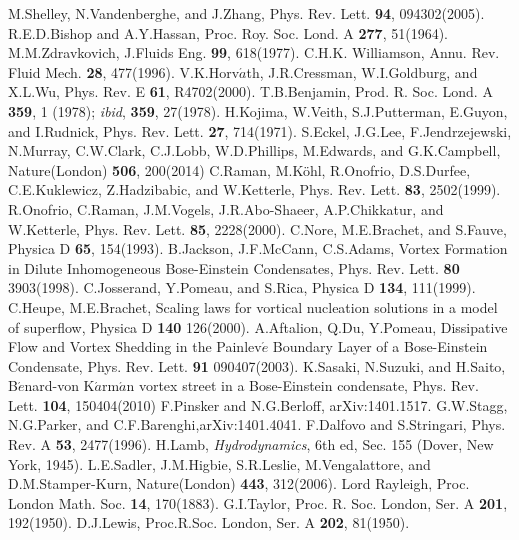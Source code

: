\documentclass[12pt,a4paper]{report}
\begin{document}
\begin{thebibliography}{81}
 M.Shelley, N.Vandenberghe, and J.Zhang, Phys. Rev. Lett. {\bf 94}, 094302(2005).
 R.E.D.Bishop and A.Y.Hassan, Proc. Roy. Soc. Lond. A {\bf 277}, 51(1964).
 M.M.Zdravkovich, J.Fluids Eng. {\bf 99}, 618(1977).
 C.H.K. Williamson, Annu. Rev. Fluid Mech. {\bf 28}, 477(1996).
 V.K.Horv$\acute{a}$th, J.R.Cressman, W.I.Goldburg, and X.L.Wu, Phys. Rev. E {\bf 61}, R4702(2000).
 T.B.Benjamin, Prod. R. Soc. Lond. A {\bf 359}, 1 (1978); {\it ibid}, {\bf 359}, 27(1978).
 H.Kojima, W.Veith, S.J.Putterman, E.Guyon, and I.Rudnick, Phys. Rev. Lett. {\bf 27}, 714(1971).
 S.Eckel, J.G.Lee, F.Jendrzejewski, N.Murray, C.W.Clark, C.J.Lobb, W.D.Phillips, M.Edwards, and G.K.Campbell, Nature(London) {\bf 506}, 200(2014)
 C.Raman, M.K\"{o}hl, R.Onofrio, D.S.Durfee, C.E.Kuklewicz, Z.Hadzibabic, and W.Ketterle, Phys. Rev. Lett. {\bf 83}, 2502(1999).
 R.Onofrio, C.Raman, J.M.Vogels, J.R.Abo-Shaeer, A.P.Chikkatur, and W.Ketterle, Phys. Rev. Lett. {\bf 85}, 2228(2000).
 C.Nore, M.E.Brachet, and S.Fauve, Physica D {\bf 65}, 154(1993).
 B.Jackson, J.F.McCann, C.S.Adams, Vortex Formation in Dilute Inhomogeneous Bose-Einstein Condensates, Phys. Rev. Lett. {\bf 80} 3903(1998).
 C.Josserand, Y.Pomeau, and S.Rica, Physica D {\bf 134}, 111(1999).
 C.Heupe, M.E.Brachet, Scaling laws for vortical nucleation solutions in a model of superflow, Physica D {\bf 140} 126(2000).
 A.Aftalion, Q.Du, Y.Pomeau, Dissipative Flow and Vortex Shedding in the Painlev$\acute{e}$ Boundary Layer of a Bose-Einstein Condensate, Phys. Rev. Lett. {\bf 91} 090407(2003).
 K.Sasaki, N.Suzuki, and H.Saito, B$\acute{e}$nard-von K$\acute{a}$rm$\acute{a}$n vortex street in a Bose-Einstein condensate, Phys. Rev. Lett. {\bf 104}, 150404(2010)
 F.Pinsker and N.G.Berloff, arXiv:1401.1517.
 G.W.Stagg, N.G.Parker, and C.F.Barenghi,arXiv:1401.4041.
 F.Dalfovo and S.Stringari, Phys. Rev. A {\bf 53}, 2477(1996).
 H.Lamb, {\it Hydrodynamics}, 6th ed, Sec. 155 (Dover, New York, 1945).
 L.E.Sadler, J.M.Higbie, S.R.Leslie, M.Vengalattore, and D.M.Stamper-Kurn, Nature(London) {\bf 443}, 312(2006).
 Lord Rayleigh, Proc. London Math. Soc. {\bf 14}, 170(1883).
 G.I.Taylor, Proc. R. Soc. London, Ser. A {\bf 201}, 192(1950).
 D.J.Lewis, Proc.R.Soc. London, Ser. A {\bf 202}, 81(1950).

\end{thebibliography}
\end{document}
